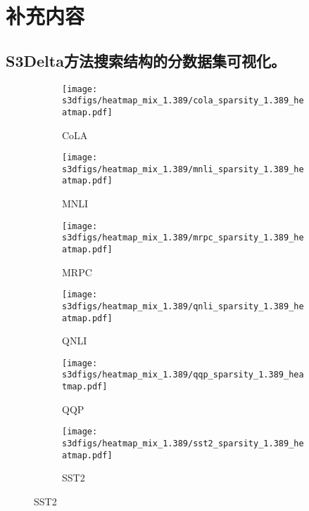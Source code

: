 
\chapter{补充内容}


\section{S3Delta方法搜索结构的分数据集可视化。}

\label{app:heatmaps}
\begin{figure}[!htbp]
  \begin{subfigure}[t]{0.49\linewidth}
    \texttt{[image: s3dfigs/heatmap\_mix\_1.389/cola\_sparsity\_1.389\_heatmap.pdf]} 
    \vspace{-0.45cm}
    \caption{CoLA}
  \end{subfigure}
  \begin{subfigure}[t]{0.49\textwidth}
    \texttt{[image: s3dfigs/heatmap\_mix\_1.389/mnli\_sparsity\_1.389\_heatmap.pdf]}
    \vspace{-0.45cm}
    \caption{MNLI}
  \end{subfigure}
  \quad
  
  \begin{subfigure}[t]{0.49\textwidth}
    \texttt{[image: s3dfigs/heatmap\_mix\_1.389/mrpc\_sparsity\_1.389\_heatmap.pdf]}
    \vspace{-0.45cm}
    \caption{MRPC}
  \end{subfigure}
  \begin{subfigure}[t]{0.49\textwidth}
    \texttt{[image: s3dfigs/heatmap\_mix\_1.389/qnli\_sparsity\_1.389\_heatmap.pdf]}
    \vspace{-0.45cm}
    \caption{QNLI}
  \end{subfigure}
  \quad
  
    
  \begin{subfigure}[t]{0.49\textwidth}

    \texttt{[image: s3dfigs/heatmap\_mix\_1.389/qqp\_sparsity\_1.389\_heatmap.pdf]}
    \vspace{-0.45cm}
    \caption{QQP}
  \end{subfigure}
  \begin{subfigure}[t]{0.49\textwidth}

    \texttt{[image: s3dfigs/heatmap\_mix\_1.389/sst2\_sparsity\_1.389\_heatmap.pdf]}
    \vspace{-0.45cm}
    \caption{SST2}
  \end{subfigure}
  \quad
  

\end{figure}
